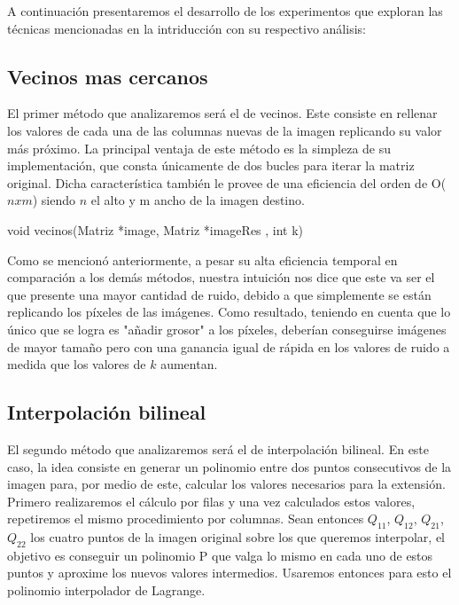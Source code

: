 A continuación presentaremos el desarrollo de los experimentos que exploran las técnicas mencionadas en la intriducción con su respectivo análisis:

\subsection{Vecinos mas cercanos}
El primer método que analizaremos será el de vecinos. Este consiste en rellenar los valores de cada una de las columnas
nuevas de la imagen replicando su valor más próximo. La principal ventaja de este método es la simpleza de su implementación, que consta únicamente de dos bucles para iterar la matriz original. Dicha característica también le provee de una eficiencia del orden de O($nxm$) siendo $n$ el alto y m ancho de la imagen destino.

\begin{algorithm}
\begin{algorithmic}[1]\parskip=1mm
\caption{void vecinos(Matriz *image, Matriz *imageRes , int k)}
    \ENDFOR
\ENDFOR
\end{algorithmic}
\end{algorithm}

Como se mencionó anteriormente, a pesar su alta eficiencia temporal en comparación a los demás métodos, nuestra intuición nos dice que este va ser el que presente una mayor cantidad de ruido, debido a que simplemente se están replicando los píxeles de las imágenes. Como resultado, teniendo en cuenta que lo único que se logra es "añadir grosor" a los píxeles, deberían conseguirse imágenes de mayor tamaño pero con una ganancia igual de rápida en los valores de ruido a medida que los valores de $k$ aumentan.

\subsection{Interpolación bilineal}
El segundo método que analizaremos será el de interpolación bilineal. En este caso, la idea consiste en generar un polinomio entre
dos puntos consecutivos de la imagen para, por medio de este, calcular los valores necesarios para la extensión. \\
Primero realizaremos el cálculo por filas y una vez calculados estos valores, repetiremos el mismo procedimiento por columnas.
Sean entonces $Q_{11}$, $Q_{12}$, $Q_{21}$, $Q_{22}$ los cuatro puntos de la imagen original sobre los que queremos interpolar, el objetivo es conseguir un polinomio P que valga lo mismo en cada uno de estos puntos y aproxime los nuevos valores intermedios. Usaremos entonces para esto el polinomio interpolador de Lagrange.

